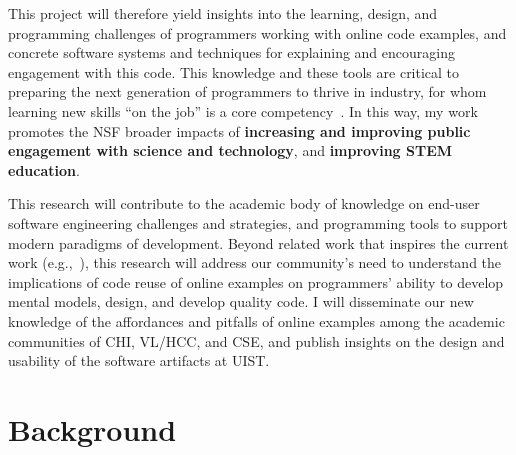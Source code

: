 \documentclass[12pt]{memoir}
\begin{document}
This project will therefore yield insights into the learning, design, and programming challenges of programmers working with online code examples, and concrete software systems and techniques for explaining and encouraging engagement with this code.
This knowledge and these tools are critical to preparing the next generation of programmers to thrive in industry, for whom learning new skills ``on the job'' is a core competency~\cite{exter_exploring_2012}.
In this way, my work promotes the NSF broader impacts of \textbf{increasing and improving public engagement with science and technology}, and \textbf{improving STEM education}.

This research will contribute to the academic body of knowledge on end-user software engineering challenges and strategies, and programming tools to support modern paradigms of development.
Beyond related work that inspires the current work (e.g.,~\cite{brandt_two_2009,ichinco_exploring_2015}),
this research will address our community's need to understand the implications of code reuse of online examples on programmers' ability to develop mental models, design, and develop quality code.
I will disseminate our new knowledge of the affordances and pitfalls of online examples among the academic communities of CHI, VL/HCC, and CSE\@, and publish insights on the design and usability of the software artifacts at UIST\@.







\section{Background}
\end{document}
